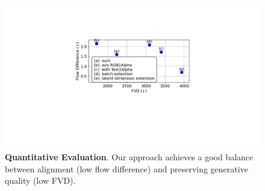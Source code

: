 \begin{figure}[t]
    \centering
    \includegraphics[width=0.9\linewidth]{figs/exp-ablation-metrics}
    \vspace{-0.1in}
    \caption{\textbf{Quantitative Evaluation}. Our approach achieves a good balance between alignment (low flow difference) and preserving generative quality (low FVD).}
    \label{fig-abaltion-metrics}
    \vspace{-0.1in}
\end{figure}










